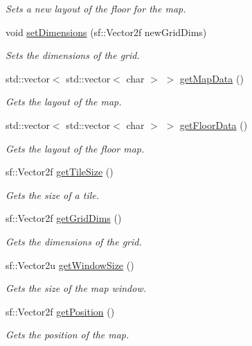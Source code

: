 \begin{DoxyCompactItemize}
\begin{DoxyCompactList}\small\item\em Sets a new layout of the floor for the map. \end{DoxyCompactList}\item 
void \hyperlink{class_map_a24edba47f4b7ce721c7f248564d1dbfd}{set\+Dimensions} (sf\+::\+Vector2f new\+Grid\+Dims)
\begin{DoxyCompactList}\small\item\em Sets the dimensions of the grid. \end{DoxyCompactList}\item 
std\+::vector$<$ std\+::vector$<$ char $>$ $>$ \hyperlink{class_map_a8fdeb5f9534c6605e352367af5c87e7a}{get\+Map\+Data} ()
\begin{DoxyCompactList}\small\item\em Gets the layout of the map. \end{DoxyCompactList}\item 
std\+::vector$<$ std\+::vector$<$ char $>$ $>$ \hyperlink{class_map_aab072e52b2795278fba8c711bb1426cf}{get\+Floor\+Data} ()
\begin{DoxyCompactList}\small\item\em Gets the layout of the floor map. \end{DoxyCompactList}\item 
sf\+::\+Vector2f \hyperlink{class_map_a8345e18835c2762a548fa46b95e4bc20}{get\+Tile\+Size} ()
\begin{DoxyCompactList}\small\item\em Gets the size of a tile. \end{DoxyCompactList}\item 
sf\+::\+Vector2f \hyperlink{class_map_a8f6919e1bf35cbfd2c14c2278b6c2ea1}{get\+Grid\+Dims} ()
\begin{DoxyCompactList}\small\item\em Gets the dimensions of the grid. \end{DoxyCompactList}\item 
sf\+::\+Vector2u \hyperlink{class_map_aeacab64b9591670cc0c908eb61ec692a}{get\+Window\+Size} ()
\begin{DoxyCompactList}\small\item\em Gets the size of the map window. \end{DoxyCompactList}\item 
sf\+::\+Vector2f \hyperlink{class_map_aabb556f4fc11e03ecebcaf270e5137d3}{get\+Position} ()
\begin{DoxyCompactList}\small\item\em Gets the position of the map. \end{DoxyCompactList}\end{DoxyCompactItemize}
